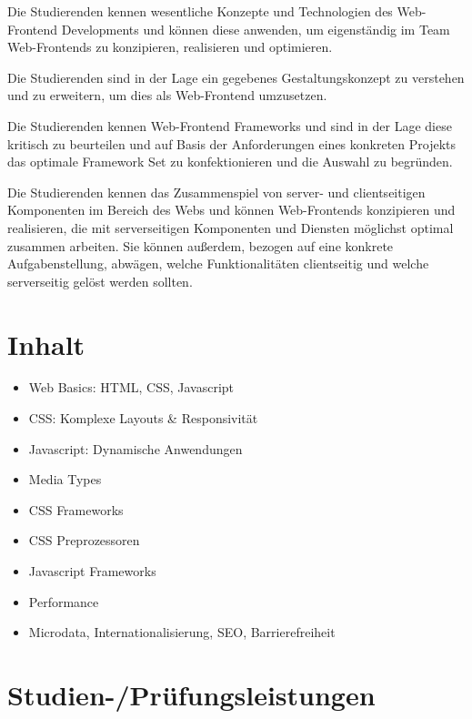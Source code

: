 Die Studierenden kennen wesentliche Konzepte und Technologien des
Web-Frontend Developments und können diese anwenden, um eigenständig im
Team Web-Frontends zu konzipieren, realisieren und optimieren.

Die Studierenden sind in der Lage ein gegebenes Gestaltungskonzept zu
verstehen und zu erweitern, um dies als Web-Frontend umzusetzen.

Die Studierenden kennen Web-Frontend Frameworks und sind in der Lage
diese kritisch zu beurteilen und auf Basis der Anforderungen eines
konkreten Projekts das optimale Framework Set zu konfektionieren und die
Auswahl zu begründen.

Die Studierenden kennen das Zusammenspiel von server- und clientseitigen
Komponenten im Bereich des Webs und können Web-Frontends konzipieren und
realisieren, die mit serverseitigen Komponenten und Diensten möglichst
optimal zusammen arbeiten. Sie können außerdem, bezogen auf eine
konkrete Aufgabenstellung, abwägen, welche Funktionalitäten clientseitig
und welche serverseitig gelöst werden sollten.

\hypertarget{inhaltpathlabel....srcmodulbeschreibungen-bachelor-bpo5ba_frontend-development}{%
\section*{Inhalt\label{../../src/modulbeschreibungen-bachelor-bpo5/BA_Frontend-Development}}\label{inhaltpathlabel....srcmodulbeschreibungen-bachelor-bpo5ba_frontend-development}}

\begin{itemize}
\tightlist
\item
  Web Basics: HTML, CSS, Javascript
\item
  CSS: Komplexe Layouts \& Responsivität
\item
  Javascript: Dynamische Anwendungen
\item
  Media Types
\item
  CSS Frameworks
\item
  CSS Preprozessoren
\item
  Javascript Frameworks
\item
  Performance
\item
  Microdata, Internationalisierung, SEO, Barrierefreiheit
\end{itemize}

\hypertarget{studien-pruxfcfungsleistungenpathlabel....srcmodulbeschreibungen-bachelor-bpo5ba_frontend-development}{%
\section*{Studien-/Prüfungsleistungen\label{../../src/modulbeschreibungen-bachelor-bpo5/BA_Frontend-Development}}\label{studien-pruxfcfungsleistungenpathlabel....srcmodulbeschreibungen-bachelor-bpo5ba_frontend-development}}

